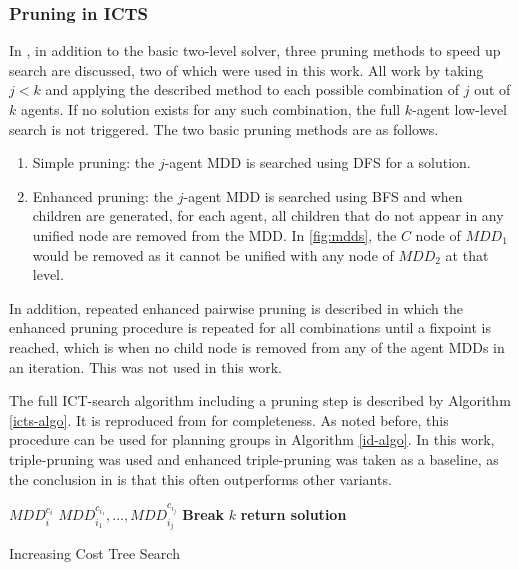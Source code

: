 \documentclass[english,10pt]{article}
\begin{document}
	\subsubsection{Pruning in ICTS}
	\label{pruning}
	In \cite{sharon2011}, in addition to the basic two-level solver, three pruning methods to speed up search are discussed, two of which were used in this work. All work by taking $j < k$ and applying the described method to each possible combination of $j$ out of $k$ agents. If no solution exists for any such combination, the full $k$-agent low-level search is not triggered. The two basic pruning methods are as follows.
	\begin{enumerate}
		\item Simple pruning: the $j$-agent MDD is searched using DFS for a solution.
		\item Enhanced pruning: the $j$-agent MDD is searched using BFS and when children are generated, for each agent, all children that do not appear in any unified node are removed from the MDD. In \ref{fig:mdds}, the $C$ node of $MDD_1$ would be removed as it cannot be unified with any node of $MDD_2$ at that level. 
	\end{enumerate}
	In addition, repeated enhanced pairwise pruning is described in which the enhanced pruning procedure is repeated for all combinations until a fixpoint is reached, which is when no child node is removed from any of the agent MDDs in an iteration. This was not used in this work. 
	
	The full ICT-search algorithm including a pruning step is described by Algorithm \ref{icts-algo}. It is reproduced from \cite{sharon2011} for completeness. As noted before, this procedure can be used for planning groups in Algorithm \ref{id-algo}. In this work, triple-pruning was used and enhanced triple-pruning was taken as a baseline, as the conclusion in \cite{sharon2011} is that this often outperforms other variants.
	\begin{algorithm}
		\begin{algorithmic}[1]
			\State {}
			 $MDD_i^{c_i}$
			\EndFor
			\State {}$MDD_{i_1}^{c_{i_1}},\ldots,MDD_{i_j}^{c_{i_j}}$
			\State \textbf{Break}
			\EndIf
			\EndFor
			\State {}$k$
			\State \textbf{return solution}
			\EndIf
			\EndFor
			
			\EndProcedure
		\end{algorithmic}
		\caption{Increasing Cost Tree Search}
		\label{icts-algo}
	\end{algorithm}
\end{document}

